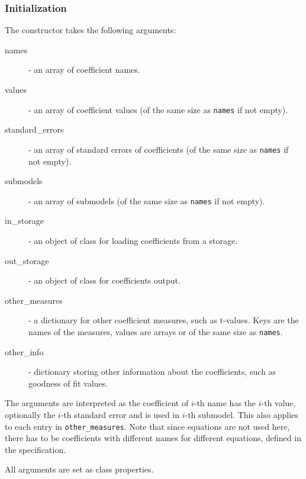 \subsubsection{Initialization}
The constructor takes the following arguments:
\begin{description}
\item[names] - an array of coefficient names.
\item[values] - an array of coefficient values (of the same size as
  \verb|names| if not empty).
\item[standard_errors] - an array of standard errors of coefficients (of the
  same size as \verb|names| if not empty).
\item[submodels] - an array of submodels (of the same size as \verb|names| if
  not empty).
\item[in_storage] - an object of class  for loading
  coefficients from a storage.
\item[out_storage] - an object of class  for coefficients
  output.
\item[other_measures] - a dictionary for other coefficient measures, such as
  t-values. Keys are the names of the measures, values are arrays or of
  the same size as \verb|names|.
\item[other_info] - dictionary storing other information about the
  coefficients, such as goodness of fit values.
\end{description}
The arguments are interpreted as the coefficient of $i$-th name has the $i$-th
value, optionally the $i$-th standard error and is used in $i$-th
submodel. This also applies to each entry in \verb|other_measures|. Note that since
equations are not used here, there has to be coefficients with different names
for different equations, defined in the specification.

All arguments are set as class properties. 

%
